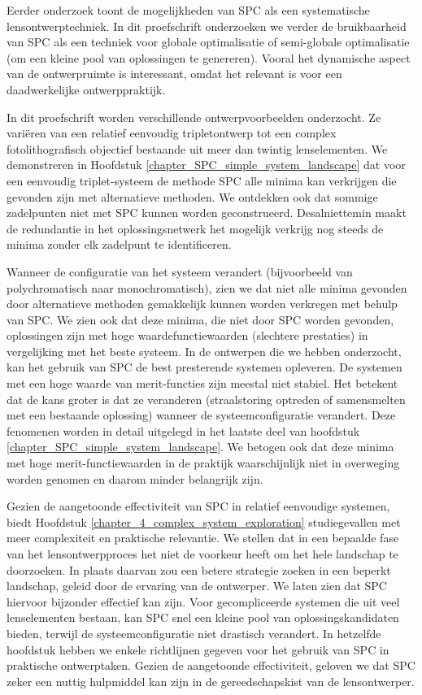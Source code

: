 {%
Eerder onderzoek toont de mogelijkheden van SPC als een systematische lensontwerptechniek. In dit proefschrift onderzoeken we verder de bruikbaarheid van SPC als een techniek voor globale optimalisatie of semi-globale optimalisatie (om een kleine pool van oplossingen te genereren). Vooral het dynamische aspect van de ontwerpruimte is interessant, omdat het relevant is voor een daadwerkelijke ontwerppraktijk.

In dit proefschrift worden verschillende ontwerpvoorbeelden onderzocht. Ze variëren van een relatief eenvoudig tripletontwerp tot een complex fotolithografisch objectief bestaande uit meer dan twintig lenselementen. We demonstreren in Hoofdstuk \ref{chapter_SPC_simple_system_landscape} dat voor een eenvoudig triplet-systeem de methode SPC alle minima kan verkrijgen die gevonden zijn met alternatieve methoden. We ontdekken ook dat sommige zadelpunten niet met SPC kunnen worden geconstrueerd. Desalniettemin maakt de redundantie in het oplossingsnetwerk het mogelijk verkrijg nog steeds de minima zonder elk zadelpunt te identificeren.

Wanneer de configuratie van het systeem verandert (bijvoorbeeld van polychromatisch naar monochromatisch), zien we dat niet alle minima gevonden door alternatieve methoden gemakkelijk kunnen worden verkregen met behulp van SPC. We zien ook dat deze minima, die niet door SPC worden gevonden, oplossingen zijn met hoge waardefunctiewaarden (slechtere prestaties) in vergelijking met het beste systeem. In de ontwerpen die we hebben onderzocht, kan het gebruik van SPC de best presterende systemen opleveren. De systemen met een hoge waarde van merit-functies zijn meestal niet stabiel. Het betekent dat de kans groter is dat ze veranderen (straalstoring optreden of samensmelten met een bestaande oplossing) wanneer de systeemconfiguratie verandert. Deze fenomenen worden in detail uitgelegd in het laatste deel van hoofdstuk \ref{chapter_SPC_simple_system_landscape}. We betogen ook dat deze minima met hoge merit-functiewaarden in de praktijk waarschijnlijk niet in overweging worden genomen en daarom minder belangrijk zijn.

Gezien de aangetoonde effectiviteit van SPC in relatief eenvoudige systemen, biedt Hoofdstuk \ref{chapter_4_complex_system_exploration} studiegevallen met meer complexiteit en praktische relevantie. We stellen dat in een bepaalde fase van het lensontwerpproces het niet de voorkeur heeft om het hele landschap te doorzoeken. In plaats daarvan zou een betere strategie zoeken in een beperkt landschap, geleid door de ervaring van de ontwerper. We laten zien dat SPC hiervoor bijzonder effectief kan zijn. Voor gecompliceerde systemen die uit veel lenselementen bestaan, kan SPC snel een kleine pool van oplossingskandidaten bieden, terwijl de systeemconfiguratie niet drastisch verandert. In hetzelfde hoofdstuk hebben we enkele richtlijnen gegeven voor het gebruik van SPC in praktische ontwerptaken. Gezien de aangetoonde effectiviteit, geloven we dat SPC zeker een nuttig hulpmiddel kan zijn in de gereedschapskist van de lensontwerper.

}


